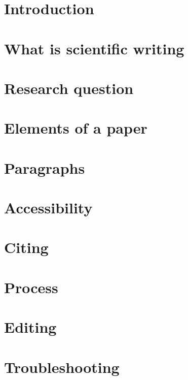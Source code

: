 \chapter{Introduction}
\label{ch:introduction}


\chapter{What is scientific writing}
\label{ch:what-is-scientific-writing}


\chapter{Research question}
\label{ch:research-question}


\chapter{Elements of a paper}
\label{ch:elements}


\chapter{Paragraphs}
\label{ch:paragraphs}


\chapter{Accessibility}
\label{ch:accessibility}


\chapter{Citing}
\label{ch:citing}


\chapter{Process}
\label{ch:process}


\chapter{Editing}
\label{ch:editing}


\chapter{Troubleshooting}
\label{ch:troubleshooting}



